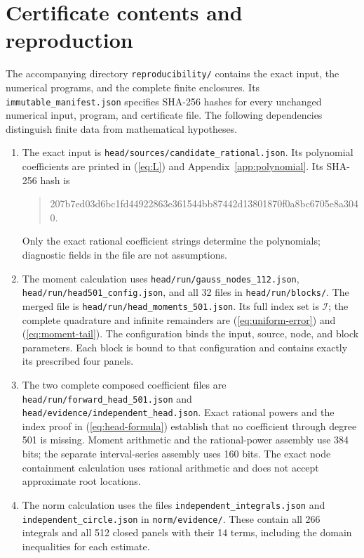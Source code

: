 \section{Certificate contents and reproduction}
The accompanying directory \nolinkurl{reproducibility/} contains the exact
input, the numerical programs, and the complete finite enclosures. Its
\nolinkurl{immutable_manifest.json} specifies SHA-256 hashes for every
unchanged numerical input, program, and certificate file. The following
dependencies distinguish finite data from mathematical hypotheses.
\begin{enumerate}
\item The exact input is \nolinkurl{head/sources/candidate_rational.json}.
Its polynomial coefficients are printed in (\ref{eq:L}) and
Appendix~\ref{app:polynomial}. Its SHA-256 hash is
\begin{quote}\small\ttfamily
207b7ed03d6bc1fd44922863e361544bb87442d13801870f0a8bc6705e8a3040.
\end{quote}
Only the exact rational coefficient strings determine the polynomials;
diagnostic fields in the file are not assumptions.
\item The moment calculation uses \nolinkurl{head/run/gauss_nodes_112.json},
\nolinkurl{head/run/head501_config.json}, and all 32 files in
\nolinkurl{head/run/blocks/}. The merged file is
\nolinkurl{head/run/head_moments_501.json}. Its full index set is
$\mathcal I$; the complete quadrature and infinite remainders are
(\ref{eq:uniform-error}) and (\ref{eq:moment-tail}). The configuration
binds the input, source, node, and block parameters. Each block is bound
to that configuration and contains exactly its prescribed four panels.
\item The two complete composed coefficient files are
\nolinkurl{head/run/forward_head_501.json} and
\nolinkurl{head/evidence/independent_head.json}. Exact rational powers
and the index proof in (\ref{eq:head-formula}) establish that no
coefficient through degree 501 is missing. Moment arithmetic and the
rational-power assembly use 384 bits; the separate interval-series
assembly uses 160 bits. The exact node containment calculation uses
rational arithmetic and does not accept approximate root locations.
\item The norm calculation uses the files
\nolinkurl{independent_integrals.json} and
\nolinkurl{independent_circle.json} in \nolinkurl{norm/evidence/}.
These contain all 266 integrals and all 512 closed panels with their
14 terms, including the domain inequalities for each estimate.

\end{enumerate}
